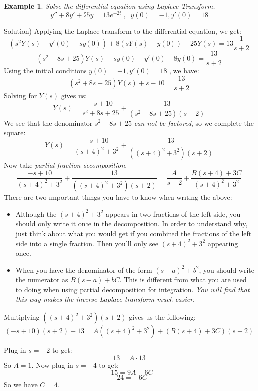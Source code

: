 \documentclass[12pt]{report}
\newtheorem{ex}{Example}[section]
\begin{document}
\begin{ex}
	Solve the differential equation using Laplace Transform.
$$y''+8y'+25y = 13 e^{-2t}  \; , \; \;  y(0)=-1, y'(0)=18 $$
\end{ex}
Solution)
Applying the Laplace transform to the differential equation, we get:
$$ \left( s^2 Y(s) - y'(0) - s y(0) \right) +8 \left( s Y(s) - y(0) \right) + 25 Y(s) =13 \frac{1}{s+2} $$
$$ \left( s^2 +8s + 25 \right) Y(s) - s y(0) -y'(0)  -8y(0) =  \frac{13}{s+2} $$
Using the initial conditions $y(0)=-1, y'(0)=18$
, we have:
$$ \left( s^2 +8s + 25 \right) Y(s) + s  -10 =  \frac{13}{s+2} $$
Solving for $Y(s)$ gives us:
$$ Y(s) = \frac{-s+10}{s^2 +8s + 25} + \frac{13}{(s^2 +8s + 25)(s+2)} $$
We see that the denominator $s^2 +8s + 25$ \textit{can not be factored}, so we complete the square:
$$ Y(s) = \frac{-s+10}{(s+4)^2 + 3^2} + \frac{13}{((s+4)^2 + 3^2)(s+2)} $$
Now take \textit{partial fraction decomposition}.
$$\frac{-s+10}{(s+4)^2 + 3^2} + \frac{13}{((s+4)^2 + 3^2)(s+2)} = \frac{A}{s+2}+\frac{B(s+4)+ 3C}{(s+4)^2 + 3^2} $$
There are two important things you have to know when writing the above:
\begin{itemize}
\item  Although the $(s+4)^2 + 3^2$ appears in two fractions of the left side, you should only write it once in the decomposition. In order to understand why, just think about what you would get if you combined the fractions of the left side into a single fraction. Then you'll only see  $(s+4)^2 + 3^2$ appearing once.
\item  When you have the denominator of the form $(s-a)^2 + b^2$, you should write the numerator as $B(s-a) + bC$. This is different from what you are used to doing when using partial decomposition for integration. \textit{You will find that this way makes the inverse Laplace transform much easier}.
\end{itemize}

Multiplying $((s+4)^2 + 3^2)(s+2)$ gives us the following:
$$(-s+10)(s+2) + 13 = A ((s+4)^2 + 3^2) + (B(s+4)+ 3C)(s+2) $$

Plug in $s=-2$ to get:
$$ 13 = A \cdot 13  $$
So $A=1$. Now plug in $s=-4$ to get:
$$-15 = 9A -6C$$
$$-24=-6C$$
So we have $C=4$.
\end{document}
